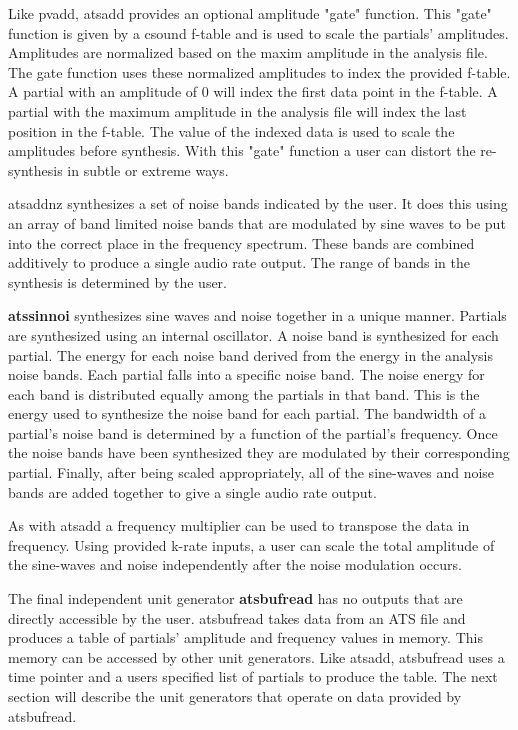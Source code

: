 \documentclass[10pt,letterpaper]{article}
\begin{document}
Like pvadd, atsadd provides an optional amplitude "gate" function.  This "gate" function is given by a csound f-table and is used to scale the partials' amplitudes.  Amplitudes are normalized based on the maxim amplitude in the analysis file.  The gate function uses these normalized amplitudes to index the provided f-table.  A partial with an amplitude of 0 will index the first data point in the f-table.  A partial with the maximum amplitude in the analysis file will index the last position in the f-table.  The value of the indexed data is used to scale the amplitudes before synthesis.  With this "gate" function a user can distort the re-synthesis in subtle or extreme ways.

atsaddnz synthesizes a set of noise bands indicated by the user.  It does this using an array of band limited noise bands that are modulated by sine waves to be put into the correct place in the frequency spectrum.  These bands are combined additively to produce a single audio rate output.  The range of bands in the synthesis is determined by the user.

\textbf{atssinnoi} synthesizes sine waves and noise together in a unique manner.  Partials are synthesized using an internal oscillator.  A noise band is synthesized for each partial.  The energy for each noise band derived from the energy in the analysis noise bands.  Each partial falls into a specific noise band.  The noise energy for each band is distributed equally among the partials in that band.  This is the energy used to synthesize the noise band for each partial.  The bandwidth of a partial's noise band is determined by a function of the partial's frequency.  Once the noise bands have been synthesized they are modulated by their corresponding partial.  Finally, after being scaled appropriately, all of the sine-waves and noise bands are added together to give a single audio rate output.

As with atsadd a frequency multiplier can be used to transpose the data in frequency.  Using provided k-rate inputs, a user can scale the total amplitude of the sine-waves and noise independently after the noise modulation occurs.

The final independent unit generator \textbf{atsbufread} has no outputs that are directly accessible by the user.  atsbufread takes data from an ATS file and produces a table of partials' amplitude and frequency values in memory.  This memory can be accessed by other unit generators.  Like atsadd, atsbufread uses a time pointer and a users specified list of partials to produce the table.  The next section will describe the unit generators that operate on data provided by atsbufread.
\end{document}
